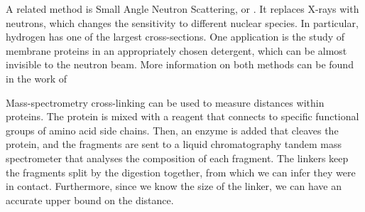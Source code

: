 A related method is Small Angle Neutron Scattering, or \SANS. \sidenote{\SANS}
It replaces X-rays with neutrons, which changes the sensitivity to different nuclear species.
In particular, hydrogen has one of the largest cross-sections.
One application is the study of membrane proteins in an appropriately chosen detergent, which can be almost invisible to the neutron beam.
More information on both methods can be found in the work of~\citet{sax}

Mass-spectrometry cross-linking \citep{cross_linking}  can be used to measure distances within proteins.
The protein is mixed with a reagent that connects to specific functional groups of amino acid side chains.
Then, an enzyme is added that cleaves the protein, and the fragments are sent to a liquid chromatography tandem mass spectrometer that analyses the composition of each fragment.
The linkers keep the fragments split by the digestion together, from which we can infer they were in contact.
Furthermore, since we know the size of the linker, we can have an accurate upper bound on the distance.
